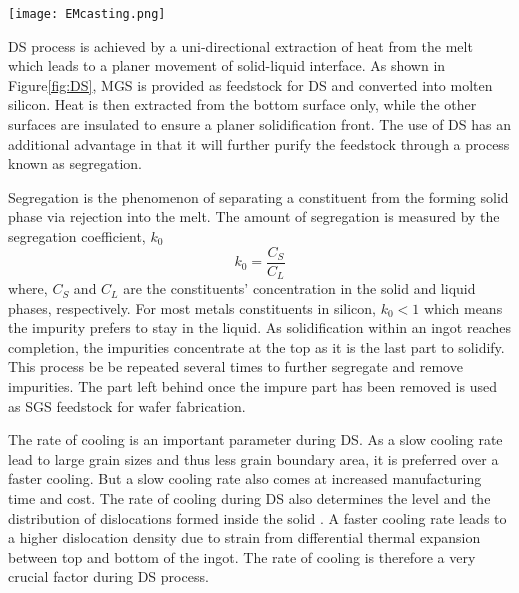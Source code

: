 \noindent
\begin{minipage}[c]{\textwidth}
\centering
        \captionsetup{type=figure}
        \texttt{[image: EMcasting.png]}
        \label{fig:DS}
 \end{minipage}
 
DS process is achieved by a uni-directional extraction of heat from the melt which leads to a planer movement of solid-liquid interface. As shown in Figure\ref{fig:DS}, MGS is provided as feedstock for DS and converted into molten silicon. Heat is then extracted from the bottom surface only, while the other surfaces are insulated to ensure a planer solidification front. The use of DS has an additional advantage in that it will further purify the feedstock through a process known as segregation.

Segregation is the phenomenon of separating a constituent from the forming solid phase via rejection into the melt. The amount of segregation is measured by the segregation coefficient, $k_{0}$
  \[k_{0}=\frac{C_{S}}{C_{L}} \]
where, $C_{S}$ and $C_{L}$ are the constituents' concentration in the solid and liquid phases, respectively. For most metals constituents in silicon, $k_{0}<1$ which means the impurity prefers to stay in the liquid. As solidification within an ingot reaches completion, the impurities concentrate at the top as it is the last part to solidify. This process be be repeated several times to further segregate and remove impurities. The part left behind once the impure part has been removed is used as SGS feedstock for wafer fabrication.  

The rate of cooling is an important parameter during DS. As a slow cooling rate lead to large grain sizes and thus less grain boundary area, it is preferred over a faster cooling. But a slow cooling rate also comes at increased manufacturing time and cost. The rate of cooling during DS also determines the level and the distribution of dislocations formed inside the solid \cite{moller2005multicrystalline, ryningen2011growth}. A faster cooling rate leads to a higher dislocation density due to strain from differential thermal expansion between top and bottom of the ingot. The rate of cooling is therefore a very crucial factor during DS process.


